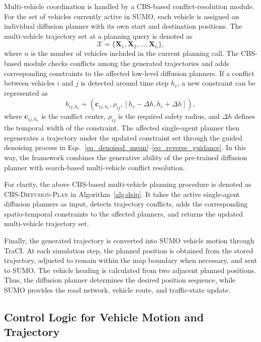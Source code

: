 \documentclass[journal]{IEEEtran}
\begin{document}
Multi-vehicle coordination is handled by a CBS-based conflict-resolution module. For the set of vehicles currently active in SUMO, each vehicle is assigned an individual diffusion planner with its own start and destination positions. The multi-vehicle trajectory set at a planning query is denoted as
\begin{equation}
\mathcal{X}
=
\{\mathbf{X}_{1},\mathbf{X}_{2},\ldots,\mathbf{X}_{n}\},
\label{eq_multi_vehicle_traj_set}
\end{equation}
where $n$ is the number of vehicles included in the current planning call. The CBS-based module checks conflicts among the generated trajectories and adds corresponding constraints to the affected low-level diffusion planners. If a conflict between vehicles $i$ and $j$ is detected around time step $h_c$, a new constraint can be represented as
\begin{equation}
b_{ij,h_c}
=
\left(
\mathbf{c}_{ij,h_c},
\rho_{ij},
[h_c-\Delta h,h_c+\Delta h]
\right),
\label{eq_new_constraint}
\end{equation}
where $\mathbf{c}_{ij,h_c}$ is the conflict center, $\rho_{ij}$ is the required safety radius, and $\Delta h$ defines the temporal width of the constraint. The affected single-agent planner then regenerates a trajectory under the updated constraint set through the guided denoising process in Eqs.~\eqref{eq_denoised_mean}--\eqref{eq_reverse_guidance}. In this way, the framework combines the generative ability of the pre-trained diffusion planner with search-based multi-vehicle conflict resolution.

For clarity, the above CBS-based multi-vehicle planning procedure is denoted as \textsc{CBS-Diffusion-Plan} in Algorithm~\ref{alg:dsip}. 
It takes the active single-agent diffusion planners as input, detects trajectory conflicts, 
adds the corresponding spatio-temporal constraints to the affected planners, 
and returns the updated multi-vehicle trajectory set.

Finally, the generated trajectory is converted into SUMO vehicle motion through TraCI. At each simulation step, the planned position is obtained from the stored trajectory, adjusted to remain within the map boundary when necessary, and sent to SUMO. The vehicle heading is calculated from two adjacent planned positions. Thus, the diffusion planner determines the desired position sequence, while SUMO provides the road network, vehicle route, and traffic-state update.

\subsection{Control Logic for Vehicle Motion and Trajectory }
\end{document}
